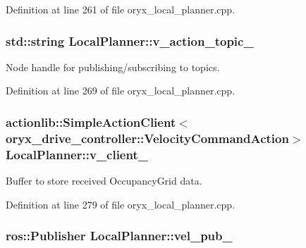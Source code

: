 \-Definition at line 261 of file oryx\-\_\-local\-\_\-planner.\-cpp.

\subsubsection[{v\-\_\-action\-\_\-topic\-\_\-}]{\setlength{\rightskip}{0pt plus 5cm}std\-::string {\bf \-Local\-Planner\-::v\-\_\-action\-\_\-topic\-\_\-}\hspace{0.3cm}{\ttfamily  [private]}}\label{classLocalPlanner_aa2d89e1db5100cee7f0b8b6db59411ac}


\-Node handle for publishing/subscribing to topics. 



\-Definition at line 269 of file oryx\-\_\-local\-\_\-planner.\-cpp.

\subsubsection[{v\-\_\-client\-\_\-}]{\setlength{\rightskip}{0pt plus 5cm}actionlib\-::\-Simple\-Action\-Client$<$oryx\-\_\-drive\-\_\-controller\-::\-Velocity\-Command\-Action$>$ {\bf \-Local\-Planner\-::v\-\_\-client\-\_\-}\hspace{0.3cm}{\ttfamily  [private]}}\label{classLocalPlanner_a4f4e9a8c0a8121240f3604b90835f2df}


\-Buffer to store received \-Occupancy\-Grid data. 



\-Definition at line 279 of file oryx\-\_\-local\-\_\-planner.\-cpp.

\subsubsection[{vel\-\_\-pub\-\_\-}]{\setlength{\rightskip}{0pt plus 5cm}ros\-::\-Publisher {\bf \-Local\-Planner\-::vel\-\_\-pub\-\_\-}\hspace{0.3cm}{\ttfamily  [private]}}\label{classLocalPlanner_a05929c79a45501fa680b29ac47b7f456}


